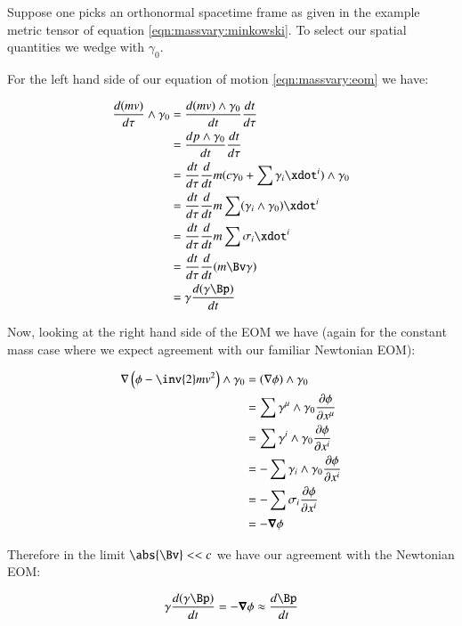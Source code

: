 Suppose one picks an orthonormal
spacetime frame as given in the example metric tensor of equation \ref{eqn:massvary:minkowski}.  To select our spatial quantities
we wedge with $\gamma_0$.

For the left hand side of our equation of motion \ref{eqn:massvary:eom} we have:

\begin{align*}
\frac{d (m v)}{d\tau} \wedge \gamma_0 
&= \frac{ d (m v) \wedge \gamma_0 }{dt} \frac{dt}{d\tau} \\
&= \frac{ d p \wedge \gamma_0 }{dt} \frac{dt}{d\tau} \\
&= \frac{dt}{d\tau} \frac{ d }{dt} m (c \gamma_0 + \sum \gamma_i \xdot^i ) \wedge \gamma_0 \\
&= \frac{dt}{d\tau} \frac{ d }{dt} m \sum (\gamma_i \wedge \gamma_0) \xdot^i  \\
&= \frac{dt}{d\tau} \frac{ d }{dt} m \sum \sigma_i \xdot^i  \\
&= \frac{dt}{d\tau} \frac{ d }{dt} (m \Bv \gamma) \\
&= \gamma \frac{ d (\gamma \Bp) }{dt}
\end{align*}

Now, looking at the right hand side of the EOM we have (again for the constant mass case where we expect agreement with our familiar Newtonian EOM):

\begin{align*}
\grad \left(\phi - \inv{2} m v^2 \right) \wedge \gamma_0 
&= (\grad \phi) \wedge \gamma_0 \\
&= \sum \gamma^{\mu} \wedge \gamma_0 \PD{x^{\mu}}{\phi} \\
&= \sum \gamma^{i} \wedge \gamma_0 \PD{x^{i}}{\phi} \\
&= -\sum \gamma_{i} \wedge \gamma_0 \PD{x^{i}}{\phi} \\
&= -\sum \sigma_i \PD{x^{i}}{\phi} \\
&= - \spacegrad \phi
\end{align*}

Therefore in the limit $\abs{\Bv} << c$ we have our agreement with the Newtonian EOM:

\begin{equation}
\gamma \frac{ d (\gamma \Bp) }{dt} = - \spacegrad \phi \approx \frac{d\Bp}{dt}
\end{equation}
